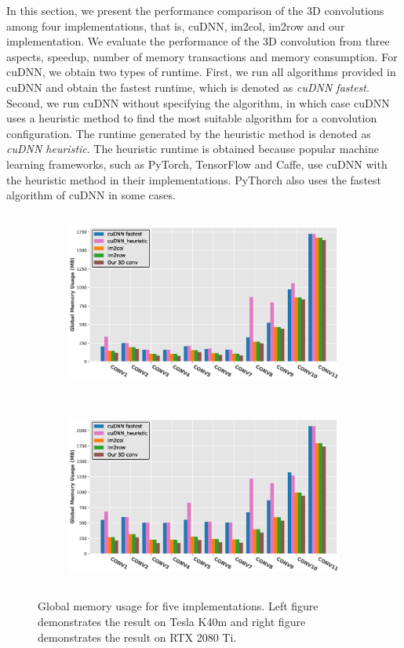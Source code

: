 In this section, we present the performance comparison of the 3D convolutions among four implementations, that is, cuDNN, im2col, im2row and our implementation. We
evaluate the performance of the 3D convolution from three aspects, speedup, number of memory transactions and memory consumption.
For cuDNN, we obtain two types of runtime. First, we run all algorithms provided in cuDNN and obtain the fastest runtime, which is denoted
as \emph{cuDNN fastest}. Second, we run cuDNN without specifying the algorithm, in which case cuDNN uses a heuristic method to find the most suitable algorithm for a convolution configuration. The runtime generated by the heuristic method is denoted as \emph{cuDNN
heuristic}. The heuristic runtime is obtained because popular machine learning frameworks, such as PyTorch, TensorFlow and Caffe,
use cuDNN with  the heuristic method in their implementations. PyThorch also uses the fastest algorithm of cuDNN in some cases.

\begin{figure}
	
	\begin{subfigure}{\columnwidth}
		\centering
		 \includegraphics[width=\columnwidth,height=6cm]{./figure/mem3d_1.eps}
		 \label{fig:3dmemk40m}
	\end{subfigure}
	\begin{subfigure}{\columnwidth}
		\centering
		 \includegraphics[width=\columnwidth,height=6cm]{./figure/mem3d_1_rtx2080.eps}
		 \label{fig:3dmemrtx2080}
	\end{subfigure}
	\caption{Global memory usage for five implementations. Left figure demonstrates the result on Tesla K40m and right figure demonstrates the result on RTX 2080 Ti.}
	\label{fig:3dmem}
\end{figure}

